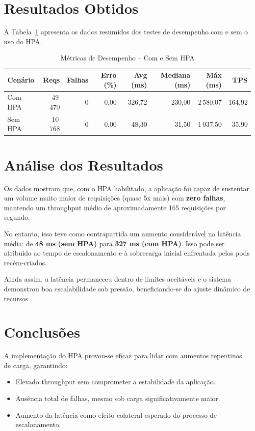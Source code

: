 \documentclass[12pt,a4paper]{report}
\begin{document}
\section{Resultados Obtidos}

A Tabela~\ref{tab:hpa} apresenta os dados resumidos dos testes de desempenho com e sem o uso do HPA.

\begin{table}[H]
\centering
\caption{Métricas de Desempenho – Com e Sem HPA}
\label{tab:hpa}
\begin{tabular}{@{}lrrrrrrr@{}}
\toprule
Cenário    & Reqs  & Falhas & Erro (\%) & Avg (ms) & Mediana (ms) & Máx (ms) & TPS   \\
\midrule
Com HPA    & 49\,470 & 0      & 0,00      & 326,72   & 230,00        & 2\,580,07 & 164,92 \\
Sem HPA    & 10\,768 & 0      & 0,00      & 48,30    & 31,50         & 1\,037,50 & 35,90  \\
\bottomrule
\end{tabular}
\end{table}

\section{Análise dos Resultados}

Os dados mostram que, com o HPA habilitado, a aplicação foi capaz de sustentar um volume muito maior de requisições (quase 5x mais) com \textbf{zero falhas}, mantendo um throughput médio de aproximadamente 165 requisições por segundo.

No entanto, isso teve como contrapartida um aumento considerável na latência média: de \textbf{48 ms (sem HPA)} para \textbf{327 ms (com HPA)}. Isso pode ser atribuído ao tempo de escalonamento e à sobrecarga inicial enfrentada pelos pods recém-criados.

Ainda assim, a latência permaneceu dentro de limites aceitáveis e o sistema demonstrou boa escalabilidade sob pressão, beneficiando-se do ajuste dinâmico de recursos.

\section{Conclusões}

A implementação do HPA provou-se eficaz para lidar com aumentos repentinos de carga, garantindo:

\begin{itemize}
    \item Elevado throughput sem comprometer a estabilidade da aplicação.
    \item Ausência total de falhas, mesmo sob carga significativamente maior.
    \item Aumento da latência como efeito colateral esperado do processo de escalonamento.
\end{itemize}
\end{document}
